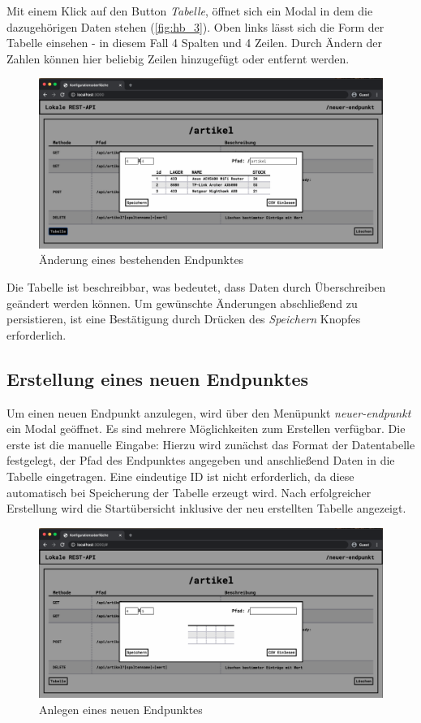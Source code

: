 Mit einem Klick auf den Button \textit{Tabelle}, öffnet sich ein Modal in dem die dazugehörigen Daten stehen (\autoref{fig:hb_3}). Oben links lässt sich die Form der Tabelle einsehen - in diesem Fall 4 Spalten und 4 Zeilen. Durch Ändern der Zahlen können hier beliebig Zeilen hinzugefügt oder entfernt werden. 

\begin{figure}[H]
    \centering
    \includegraphics[width=15cm]{figures/hb_3.png}    %
    \caption{Änderung eines bestehenden Endpunktes}
    \label{fig:hb_3}
\end{figure}

Die Tabelle ist beschreibbar, was bedeutet, dass Daten durch Überschreiben geändert werden können. Um gewünschte Änderungen abschließend zu persistieren, ist eine Bestätigung durch Drücken des \textit{Speichern} Knopfes erforderlich.

\subsection{Erstellung eines neuen Endpunktes}

Um einen neuen Endpunkt anzulegen, wird über den Menüpunkt \textit{neuer-endpunkt} ein Modal geöffnet. Es sind mehrere Möglichkeiten zum Erstellen verfügbar. Die erste ist die manuelle Eingabe: 
Hierzu wird zunächst das Format der Datentabelle festgelegt, der Pfad des Endpunktes angegeben und anschließend Daten in die Tabelle eingetragen. Eine eindeutige ID ist nicht erforderlich, da diese automatisch bei Speicherung der Tabelle erzeugt wird. Nach erfolgreicher Erstellung wird die Startübersicht inklusive der neu erstellten Tabelle angezeigt. 

\begin{figure}[H]
    \centering
    \includegraphics[width=15cm]{figures/hb_4.png}    %
    \caption{Anlegen eines neuen Endpunktes}
    \label{fig:hb_4}
\end{figure}

